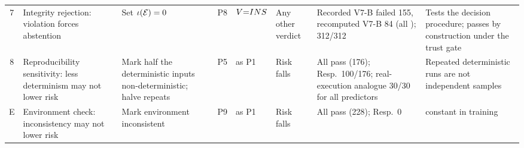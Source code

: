 \begin{table}[!t]
\begin{tabular}{|c|L{2.35cm}|L{2.35cm}|c|L{2.1cm}|L{2.0cm}|L{3.3cm}|L{2.35cm}|}
7 & Integrity rejection: violation forces abstention & Set $\iota(\mathcal{E})=0$ & P8 & $V{=}INS{}$ & Any other verdict & Recorded V7-B failed 155, recomputed V7-B 84 (all \DIV{}); \sbg{} 312/312 & Tests the decision procedure; passes by construction under the trust gate \\
8 & Reproducibility sensitivity: less determinism may not lower risk & Mark half the deterministic inputs non-deterministic; halve repeats & P5 & as P1 & Risk falls & All pass (176); Resp.\ 100/176; real-execution analogue 30/30 for all predictors & Repeated deterministic runs are not independent samples \\
E & Environment check: inconsistency may not lower risk & Mark environment inconsistent & P9 & as P1 & Risk falls & All pass (228); Resp.\ 0 &  constant in training \\
\hline
\end{tabular}
\end{table}
